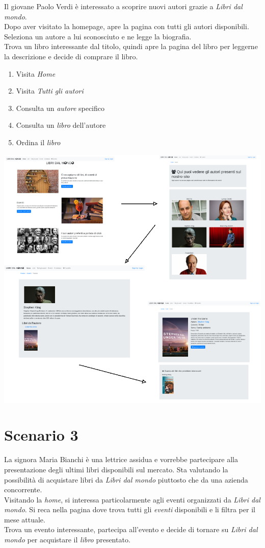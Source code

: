 \documentclass[12pt,a4paper,oneside]{report}
\begin{document}
Il giovane Paolo Verdi è interessato a scoprire nuovi autori grazie a \textit{Libri dal mondo}.\\ 
Dopo aver visitato la homepage, apre la pagina con tutti gli autori disponibili. Seleziona un autore a lui sconosciuto e ne legge la biografia. \\
Trova un libro interessante dal titolo, quindi apre la pagina del libro per leggerne la descrizione e decide di comprare il libro.

\begin{enumerate}
	\item Visita \textit{Home}
	\item Visita \textit{Tutti gli autori}
	\item Consulta un \textit{autore} specifico
	\item Consulta un \textit{libro} dell'autore
	\item Ordina il \textit{libro}
\end{enumerate}

\includegraphics[width=1\textwidth]{scenario_2}

\section{Scenario 3}

La signora Maria Bianchi è una lettrice assidua e vorrebbe partecipare alla presentazione degli ultimi libri disponibili sul mercato. Sta valutando la possibilità di acquistare libri da \textit{Libri dal mondo} piuttosto che da una azienda concorrente. \\
Visitando la \textit{home}, si interessa particolarmente agli eventi organizzati da \textit{Libri dal mondo}. Si reca nella pagina dove trova tutti gli \textit{eventi} disponibili e li filtra per il mese attuale. \\
Trova un evento interessante, partecipa all'evento e decide di tornare su \textit{Libri dal mondo} per acquistare il \textit{libro} presentato.
\end{document}
